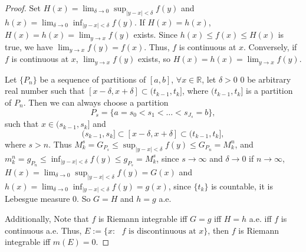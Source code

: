 \begin{proof}
    Set $H(x)=\lim_{\delta\rightarrow0}\sup_{|y-x|<\delta}f(y)$ and
    $h(x)=\lim_{\delta\rightarrow0}\inf_{|y-x|<\delta}f(y)$.
    If $H(x)=h(x)$, $H(x)=h(x)=\lim_{y\rightarrow x}f(y)$ exists.
    Since $h(x)\leq f(x)\leq H(x)$ is true, we have 
    $\lim_{y\rightarrow x}f(y)=f(x)$. Thus, $f$ is continuous at $x$.
    Conversely, if $f$ is continuous at $x$, 
    $\lim_{y\rightarrow x}f(y)$ exists, so $H(x)=h(x)=\lim_{y\rightarrow x}f(y)$.
    
    Let $\{P_n\}$ be a sequence of partitions of $[a, b]$, $\forall x\in\mathbb{R}$,
    let $\delta>0$ 0 be arbitrary real number such that 
    $[x-\delta,x+\delta]\subset(t_{k-1},t_k]$, where $(t_{k-1},t_k]$
    is a partition of $P_n$. Then we can always choose a partition
    \begin{displaymath}
        P_s=\{a=s_0<s_1<\ldots<s_{J_s}=b\},
    \end{displaymath}
    such that $x\in(s_{k-1},s_k]$ and
    \begin{displaymath}
        (s_{k-1},s_k]\subset[x-\delta,x+\delta]\subset(t_{k-1},t_k],
    \end{displaymath}
    where $s>n$. Thus $M_k^s=G_{P_s}\leq\sup_{|y-x|<\delta}f(y)\leq
    G_{P_n}=M_k^n$, and $m_k^n=g_{P_n}\leq\inf_{|y-x|<\delta}f(y)\leq
    g_{P_s}=M_k^s$, since $s\rightarrow\infty$ and $\delta\rightarrow0$ 
    if $n\rightarrow\infty$,  $H(x)=\lim_{\delta\rightarrow0}
    \sup_{|y-x|<\delta}f(y)=G(x)$ and $h(x)=\lim_{\delta\rightarrow0}
    \inf_{|y-x|<\delta}f(y)=g(x)$, since $\{t_k\}$ is countable, 
    it is Lebesgue measure 0. So $G=H$ and $h=g$ a.e.

    Additionally, Note that $f$ is Riemann integrable iff $G = g$ 
    iff $H = h$ a.e. iff $f$ is continuous a.e. Thus, 
    $E:=\{x:\text{ }f\text{ is discontinuous at }x\}$,
    then $f$ is Riemann integrable iff $m(E)=0$.  
\end{proof}
